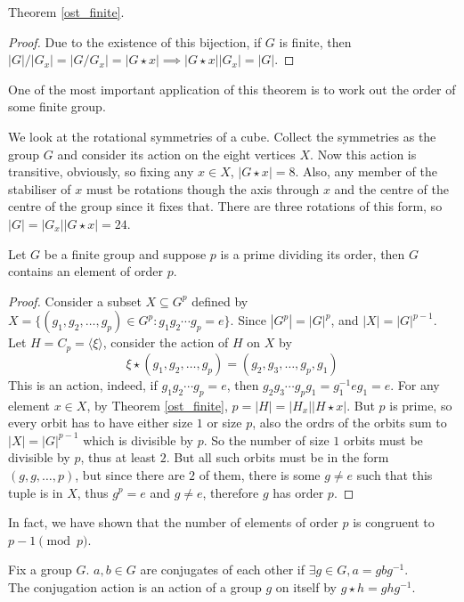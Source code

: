 \begin{corollary}
    Theorem \ref{ost_finite}.
\end{corollary}
\begin{proof}
    Due to the existence of this bijection, if $G$ is finite, then $|G|/|G_x|=|G/G_x|=|G\star x|\implies |G\star x||G_x|=|G|$.
\end{proof}
One of the most important application of this theorem is to work out the order of some finite group.
\begin{example}
    We look at the rotational symmetries of a cube.
    Collect the symmetries as the group $G$ and consider its action on the eight vertices $X$.
    Now this action is transitive, obviously, so fixing any $x\in X$, $|G\star x|=8$.
    Also, any member of the stabiliser of $x$ must be rotations though the axis through $x$ and the centre of the centre of the group since it fixes that.
    There are three rotations of this form, so $|G|=|G_x||G\star x|=24$.
\end{example}
\begin{theorem}\label{cauchy}
    Let $G$ be a finite group and suppose $p$ is a prime dividing its order, then $G$ contains an element of order $p$.
\end{theorem}
\begin{proof}
    Consider a subset $X\subseteq G^p$ defined by $X=\{(g_1,g_2,\ldots, g_p)\in G^p:g_1g_2\cdots g_p=e\}$.
    Since $|G^p|=|G|^p$, and $|X|=|G|^{p-1}$.
    Let $H=C_p=\langle\xi\rangle$, consider the action of $H$ on $X$ by
    $$\xi\star (g_1,g_2,\ldots,g_p)=(g_2,g_3,\ldots,g_p,g_1)$$
    This is an action, indeed, if $g_1g_2\cdots g_p=e$, then $g_2g_3\cdots g_pg_1=g_1^{-1}eg_1=e$.
    For any element $x\in X$, by Theorem \ref{ost_finite}, $p=|H|=|H_x||H\star x|$.
    But $p$ is prime, so every orbit has to have either size $1$ or size $p$, also the ordrs of the orbits sum to $|X|=|G|^{p-1}$ which is divisible by $p$.
    So the number of size $1$ orbits must be divisible by $p$, thus at least $2$.
    But all such orbits must be in the form $(g,g,\ldots, p)$, but since there are $2$ of them, there is some $g\neq e$ such that this tuple is in $X$, thus $g^p=e$ and $g\neq e$, therefore $g$ has order $p$.
\end{proof}
In fact, we have shown that the number of elements of order $p$ is congruent to $p-1\pmod{p}$.
\begin{definition}
    Fix a group $G$.
    $a,b\in G$ are conjugates of each other if $\exists g\in G, a=gbg^{-1}$.\\
    The conjugation action is an action of a group $g$ on itself by $g\star h=ghg^{-1}$.
\end{definition}
